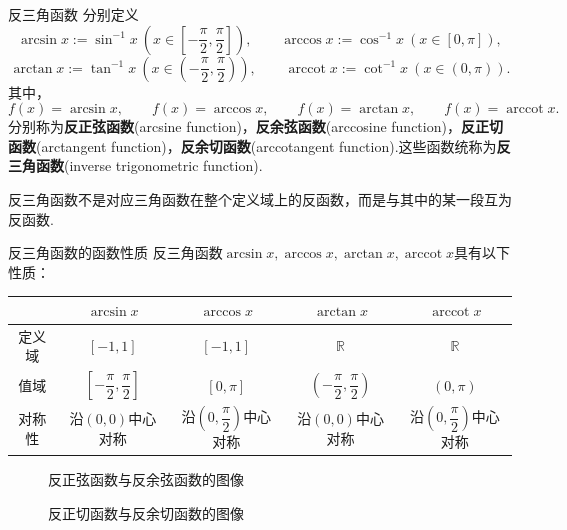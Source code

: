 \documentclass[lang=cn, zihao=5]{elegantbook}
\DeclareMathOperator{\arccot}{arccot}
\begin{document}
\begin{definition}{反三角函数}
    分别定义
    $$\arcsin{x}:=\sin ^{-1}x~(x \in [-\frac{\pi}{2} ,\frac{\pi}{2}]), \qquad \arccos{x}:=\cos ^{-1}x~(x \in [0,\pi]),$$
    $$\arctan{x}:= \tan ^{-1}x~(x \in (-\frac{\pi}{2},\frac{\pi}{2})), \qquad \arccot{x}:=\cot ^{-1}x~(x \in (0,\pi)).$$
    其中，$$f(x)=\arcsin x, \qquad f(x)=\arccos x, \qquad f(x)=\arctan x, \qquad f(x)=\arccot x.$$
    分别称为\textbf{反正弦函数}(arcsine function)，\textbf{反余弦函数}(arccosine function)，\textbf{反正切函数}(arctangent function)，\textbf{反余切函数}(arccotangent function).这些函数统称为\textbf{反三角函数}(inverse trigonometric function).
\end{definition}
\begin{note}
    反三角函数不是对应三角函数在整个定义域上的反函数，而是与其中的某一段互为反函数.
\end{note}

\begin{proposition}{反三角函数的函数性质}
    反三角函数$\arcsin{x},\arccos{x},\arctan{x},\arccot{x}$具有以下性质：

    \vspace{1em}
    \centering
    \renewcommand\arraystretch{1.2}
    \begin{tabular}{c|c|c|c|c}
        \hline
          & $\arcsin{x}$ & $\arccos{x}$ & $\arctan{x}$ & $\arccot{x}$ \\ \hline
        定义域 & $[-1,1]$ & $[-1,1]$ & $\mathbb{R}$ & $\mathbb{R}$ \\ \hline
        值域 & $[-\dfrac{\pi}{2} ,\dfrac{\pi}{2}]$ & $[0,\pi]$ & $(-\dfrac{\pi}{2},\dfrac{\pi}{2})$ & $(0,\pi)$ \\ \hline
        对称性 & 沿$(0,0)$中心对称 & 沿$(0,\dfrac{\pi}{2})$中心对称 & 沿$(0,0)$中心对称 & 沿$(0,\dfrac{\pi}{2})$中心对称 \\ \hline
    \end{tabular}
    
\end{proposition}

\begin{figure}[h!]
	\centering
	
	\caption{反正弦函数与反余弦函数的图像}
\end{figure}

\begin{figure}[h!]
	\centering
	
	\caption{反正切函数与反余切函数的图像}
\end{figure}
\end{document}
